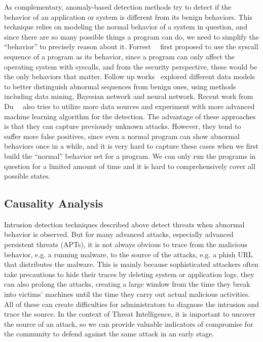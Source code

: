 As complementary, anomaly-based detection methods try to detect if
the behavior of an application or system is different from its benign
behaviors. This technique relies on modeling the normal behavior of a 
system in question, and since there are so many possible things a program 
can do, we need to simplify the ``behavior'' to precisely reason about 
it. Forrest~\etal~\cite{forrest1996sense} first proposed to use the
syscall sequence of a program as its behavior, since a program can only
affect the operating system with syscalls, and from the security 
perspective, these would be the only behaviors that matter. Follow up
works~\cite{lee1998data, warrender1999detecting, mutz2006anomalous}
explored different data models to better distinguish abnormal sequences
from benign ones, using methods including data mining, Bayesian network and 
neural network. Recent work from Du~\etal~\cite{du2017deeplog} also tries 
to utilize more data sources and experiment with more advanced machine
learning algorithm for the detection. The advantage of these approaches 
is that they can capture previously unknown attacks. However, they tend
to suffer more false positives, since even a normal program can show 
abnormal behaviors once in a while, and it is very hard to capture these
cases when we first build the ``normal'' behavior set for a program. We 
can only run the programs in question for a limited amount of time and 
it is hard to comprehensively cover all possible states.

\subsection{Causality Analysis}
Intrusion detection techniques described above detect threats 
when abnormal behavior is observed. But for many advanced 
attacks, especially advanced persistent threats (APTs), it 
is not always obvious to trace from the malicious behavior, e.g.
a running malware, to the source of the attacks, e.g. a phish 
URL that distributes the malware. This is mainly because sophisticated
attackers often take precautions to hide their traces by deleting
system or application logs, they can also prolong the attacks, 
creating a large window from the time they break into victims' 
machines until the time they carry out actual malicious activities. 
All of these can create difficulties for administrators to diagnose
the intrusion and trace the source. In the context of Threat 
Intelligence, it is important to uncover the source of 
an attack, so we can provide valuable indicators of compromise for the 
community to defend against the same attack in an early stage.

